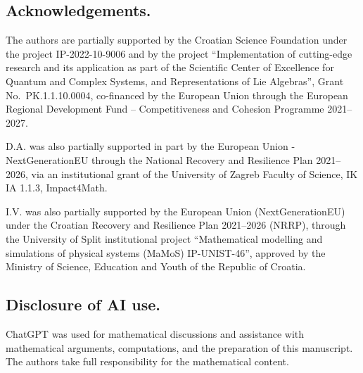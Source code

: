 \documentclass[11pt]{amsart}
\numberwithin{equation}{section}
\theoremstyle{definition}
\theoremstyle{remark}
\begin{document}

 
\subsection*{Acknowledgements.}
The authors are partially supported by the Croatian Science Foundation
under the project IP-2022-10-9006 and by the project
``Implementation of cutting-edge research and its application as part
of the Scientific Center of Excellence for Quantum and Complex Systems,
and Representations of Lie Algebras'', Grant No.~\mbox{PK.1.1.10.0004},
co-financed by the European Union through the European Regional
Development Fund -- Competitiveness and Cohesion Programme 2021--2027.

D.A. was also partially  supported in part
by the European Union - NextGenerationEU through the National Recovery and Resilience
Plan 2021–2026, via an institutional grant of the University of Zagreb Faculty of Science, IK IA 1.1.3, Impact4Math.

I.V. was also partially supported by the European Union (NextGenerationEU) under the Croatian Recovery and Resilience Plan 2021–2026 (NRRP), through the University of Split institutional project “Mathematical modelling and simulations of physical systems (MaMoS) IP-UNIST-46”,
approved by the Ministry of Science, Education and Youth of the Republic
of Croatia.

 


 \subsection*{Disclosure of AI use.}
ChatGPT was used for mathematical discussions and assistance
with mathematical arguments, computations, and the preparation
of this manuscript.
The authors take full responsibility for the mathematical content.
\end{document}
